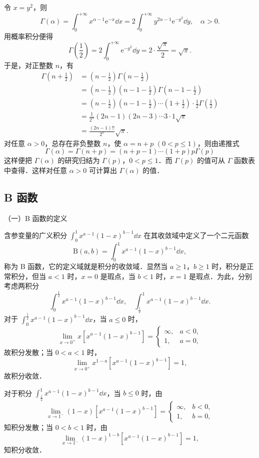 令 $x=y^{2}$，则
\[
\Gamma(\alpha)=\int_{0}^{+\infty}x^{\alpha-1}\mathrm{e}^{-x}\dd x=2\int_{0}^{+\infty}y^{2\alpha-1}\mathrm{e}^{-y^{2}}\dd y,\quad\alpha>0.
\]
用概率积分便得
\[
\Gamma\left(\frac{1}{2}\right)=2\int_{0}^{+\infty}\mathrm{e}^{-y^{2}}\dd y=2\cdot\frac{\sqrt{\pi}}{2}=\sqrt{\pi}.
\]
于是，对正整数 $n$，有
\[
\begin{aligned}
\Gamma\left(n+\frac{1}{2}\right)&=\left(n-\frac{1}{2}\right)\Gamma\left(n-\frac{1}{2}\right)\\
&=\left(n-\frac{1}{2}\right)\left(n-1-\frac{1}{2}\right)\Gamma\left(n-1-\frac{1}{2}\right)\\
&=\left(n-\frac{1}{2}\right)\left(n-1-\frac{1}{2}\right)\cdots\left(1+\frac{1}{2}\right)\cdot\frac{1}{2}\Gamma\left(\frac{1}{2}\right)\\
&=\frac{1}{2^{n}}(2n-1)(2n-3)\cdots 3\cdot 1\sqrt{\pi}\\
&=\frac{(2n-1)!!}{2^{n}}\sqrt{\pi}.
\end{aligned}
\]
对任意 $\alpha>0$，总存在非负整数 $n$，使 $\alpha=n+p$ $(0<p\leqslant 1)$，则由递推式
\[
\Gamma(\alpha)=\Gamma(n+p)=(n+p-1)\cdots(1+p)p\Gamma(p)
\]
这样便把 $\Gamma(\alpha)$ 的研究归结为 $\Gamma(p)$，$0<p\leqslant 1$．而 $\Gamma(p)$ 的值可从 $\Gamma$ 函数表中查得．这样对任意 $\alpha>0$ 可计算出 $\Gamma(\alpha)$ 的值．

\subsection{B 函数}

（一）B 函数的定义

含参变量的广义积分 $\displaystyle\int_{0}^{1}x^{a-1}(1-x)^{b-1}\dd x$ 在其收敛域中定义了一个二元函数
\[
\mathrm{B}(a,b)=\int_{0}^{1}x^{a-1}(1-x)^{b-1}\dd x,
\]
称为 B 函数，它的定义域就是积分的收敛域．显然当 $a\geqslant 1$，$b\geqslant 1$ 时，积分是正常积分，但当 $a<1$ 时，$x=0$ 是瑕点，当 $b<1$ 时，$x=1$ 是瑕点．为此，分别考虑两积分
\[
\int_{0}^{\frac{1}{2}}x^{a-1}(1-x)^{b-1}\dd x,\quad\int_{\frac{1}{2}}^{1}x^{a-1}(1-x)^{b-1}\dd x.
\]
对于 $\displaystyle\int_{0}^{\frac{1}{2}}x^{a-1}(1-x)^{b-1}\dd x$，当 $a\leqslant 0$ 时，
\[
\lim_{x\to 0^{+}}x\left[x^{a-1}(1-x)^{b-1}\right]=\begin{cases}
\infty,&a<0,\\
1,&a=0,
\end{cases}
\]
故积分发散；当 $0<a<1$ 时，
\[
\lim_{x\to 0^{+}}x^{1-a}\left[x^{a-1}(1-x)^{b-1}\right]=1,
\]
故积分收敛．

对于积分 $\displaystyle\int_{\frac{1}{2}}^{1}x^{a-1}(1-x)^{b-1}\dd x$，当 $b\leqslant 0$ 时，由
\[
\lim_{x\to 1^{-}}(1-x)\left[x^{a-1}(1-x)^{b-1}\right]=\begin{cases}
\infty,&b<0,\\
1,&b=0,
\end{cases}
\]
知积分发散；当 $0<b<1$ 时，由
\[
\lim_{x\to 1^{-}}(1-x)^{1-b}\left[x^{a-1}(1-x)^{b-1}\right]=1,
\]
知积分收敛．

